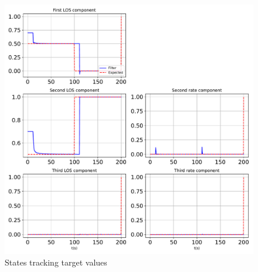 \begin{figure}[htbp]\centerline{\includegraphics[height=0.9\textwidth, keepaspectratio]{AutoTeX/StatesTarget}}\caption{States tracking target values}\label{fig:StatesTarget}\end{figure}